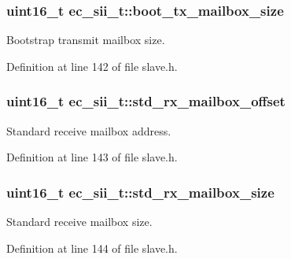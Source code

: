 \subsubsection[{boot\-\_\-tx\-\_\-mailbox\-\_\-size}]{\setlength{\rightskip}{0pt plus 5cm}uint16\-\_\-t {\bf ec\-\_\-sii\-\_\-t\-::boot\-\_\-tx\-\_\-mailbox\-\_\-size}}\label{structec__sii__t_a65ead35255e661f345c9d15033347b10}


\-Bootstrap transmit mailbox size. 



\-Definition at line 142 of file slave.\-h.

\subsubsection[{std\-\_\-rx\-\_\-mailbox\-\_\-offset}]{\setlength{\rightskip}{0pt plus 5cm}uint16\-\_\-t {\bf ec\-\_\-sii\-\_\-t\-::std\-\_\-rx\-\_\-mailbox\-\_\-offset}}\label{structec__sii__t_a0172b2d04dcbc56d75abc1efa76dd392}


\-Standard receive mailbox address. 



\-Definition at line 143 of file slave.\-h.

\subsubsection[{std\-\_\-rx\-\_\-mailbox\-\_\-size}]{\setlength{\rightskip}{0pt plus 5cm}uint16\-\_\-t {\bf ec\-\_\-sii\-\_\-t\-::std\-\_\-rx\-\_\-mailbox\-\_\-size}}\label{structec__sii__t_abcdfe5aa59f2fcbf9deaa4d1a9c954fe}


\-Standard receive mailbox size. 



\-Definition at line 144 of file slave.\-h.

